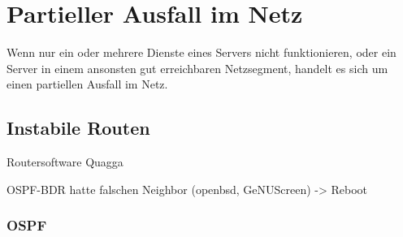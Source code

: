 \chapter{Partieller Ausfall im Netz}
\label{cha:netz-teilausfall}

\begin{abstractsec}
  Wenn nur ein oder mehrere Dienste eines Servers nicht funktionieren, oder
  ein Server in einem ansonsten gut erreichbaren Netzsegment, handelt es sich
  um einen partiellen Ausfall im Netz.
\end{abstractsec}

\section{Instabile Routen}
\label{sec:instabile-routen}

\begin{notes}
\item Routersoftware Quagga
\item OSPF-BDR hatte falschen Neighbor (openbsd, GeNUScreen) -> Reboot
\end{notes}


\subsection{OSPF}
\label{sec:ospf}

